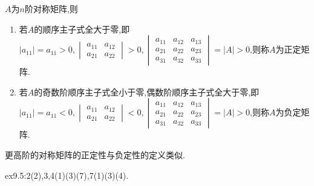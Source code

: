 \begin{definition}
    [正定矩阵与负定矩阵]
    $A$为$n$阶对称矩阵,则
    \begin{enumerate}
        \item 若$A$的顺序主子式全大于零,即$|a_{11}| = a_{11} > 0, \begin{vmatrix}
            a_{11} & a_{12}\\
            a_{21} & a_{22}
        \end{vmatrix} >0,\begin{vmatrix}
            a_{11} & a_{12} & a_{13}\\
            a_{21} & a_{22} & a_{23}\\
            a_{31} & a_{32} & a_{33}
        \end{vmatrix} = |A| > 0 $,则称$A$为正定矩阵.
        \item 若$A$的奇数阶顺序主子式全小于零,偶数阶顺序主子式全大于零,即$|a_{11}| = a_{11} < 0, \begin{vmatrix}
            a_{11} & a_{12}\\
            a_{21} & a_{22}
        \end{vmatrix} <0,\begin{vmatrix}
            a_{11} & a_{12} & a_{13}\\
            a_{21} & a_{22} & a_{23}\\
            a_{31} & a_{32} & a_{33}
        \end{vmatrix} = |A| > 0 $,则称$A$为负定矩阵.
    \end{enumerate}

    更高阶的对称矩阵的正定性与负定性的定义类似.
\end{definition}

\begin{homework}
    ex9.5:2(2),3,4(1)(3)(7),7(1)(3)(4).
\end{homework}











